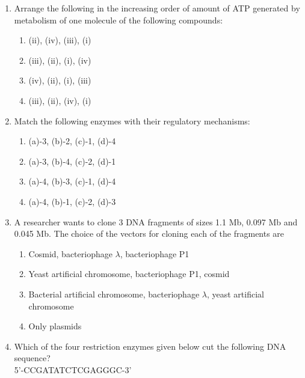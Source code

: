 \documentclass[journal]{IEEEtran}
\begin{document}
\begin{enumerate}
\item Arrange the following in the increasing order of amount of ATP generated by metabolism of one molecule of the following compounds:\hfill  \textit{}
\begin{enumerate}
    \item (ii), (iv), (iii), (i)
    \item (iii), (ii), (i), (iv)
    \item (iv), (ii), (i), (iii)
    \item (iii), (ii), (iv), (i)
\end{enumerate}

\item Match the following enzymes with their regulatory mechanisms:\hfill  \textit{}
\begin{enumerate}
    \item (a)-3, (b)-2, (c)-1, (d)-4
    \item (a)-3, (b)-4, (c)-2, (d)-1
    \item (a)-4, (b)-3, (c)-1, (d)-4
    \item (a)-4, (b)-1, (c)-2, (d)-3
\end{enumerate}

\item A researcher wants to clone 3 DNA fragments of sizes 1.1 Mb, 0.097 Mb and 0.045 Mb. The choice of the vectors for cloning each of the fragments are\hfill  \textit{}
\begin{enumerate}
    \item Cosmid, bacteriophage $\lambda$, bacteriophage P1
    \item Yeast artificial chromosome, bacteriophage P1, cosmid
    \item Bacterial artificial chromosome, bacteriophage $\lambda$, yeast artificial chromosome
    \item Only plasmids
\end{enumerate}

\item Which of the four restriction enzymes given below cut the following DNA sequence?\\
5'-CCGATATCTCGAGGGC-3'\hfill  \textit{}
\begin{enumerate}
\end{enumerate}


\end{enumerate}
\end{document}
